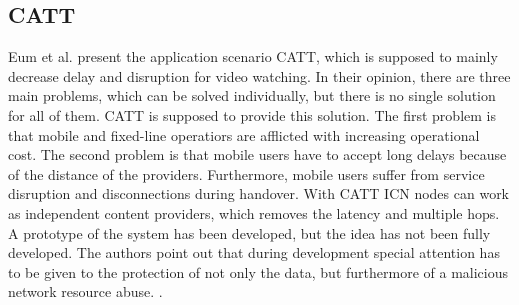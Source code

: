 \subsection{CATT}
 Eum et al. present the application scenario CATT, which is supposed to mainly decrease delay and disruption for video watching. In their opinion, there are three main problems, which can be solved individually, but there is no single solution for all of them. CATT is supposed to provide this solution. The first problem is that mobile and fixed-line operatiors are afflicted with increasing operational cost. The second problem is that mobile users have to accept long delays because of the distance of the providers. Furthermore, mobile users suffer from service disruption and disconnections during handover. With CATT ICN nodes can work as independent content providers, which removes the latency and multiple hops. \\
A prototype of the system has been developed, but the idea has not been fully developed. The authors point out that during development special attention has to be given to the protection of not only the data, but furthermore of a malicious network resource abuse.  \cite{Eum:2015:DII:2803530.2803728}. 
